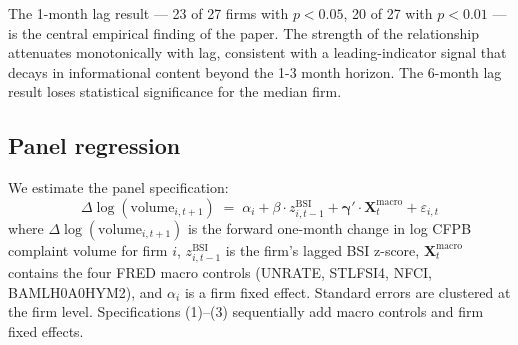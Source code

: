 \documentclass[11pt,a4paper]{article}
\begin{document}
\begin{table}[h]
\centering\small
{}
\caption{Granger causality F-tests of $\text{BSI}_{i,t-k} \to \text{volume}_{i,t}$ at lag $k$, aggregated across the 27-firm population. The 1-month-lag result is the strongest finding in the paper: 85\% of firms reject the no-Granger-causality null at $p<0.05$, with median p-value $0.0005$. Source: \texttt{empirics\_v2/out/granger\_aggregate.csv}.}\label{tab:granger}
\end{table}

\noindent The 1-month lag result --- 23 of 27 firms with $p<0.05$, 20 of 27 with $p<0.01$ --- is the central empirical finding of the paper. The strength of the relationship attenuates monotonically with lag, consistent with a leading-indicator signal that decays in informational content beyond the 1-3 month horizon. The 6-month lag result loses statistical significance for the median firm.

\subsection{Panel regression}\label{sec:results_panel}

We estimate the panel specification:
\begin{equation}\label{eq:panel}
\Delta \log(\text{volume}_{i,t+1}) \;=\; \alpha_i + \beta \cdot z^{\text{BSI}}_{i,t-1} + \boldsymbol{\gamma}' \cdot \mathbf{X}^{\text{macro}}_{t} + \varepsilon_{i,t}
\end{equation}
where $\Delta \log(\text{volume}_{i,t+1})$ is the forward one-month change in log CFPB complaint volume for firm $i$, $z^{\text{BSI}}_{i,t-1}$ is the firm's lagged BSI z-score, $\mathbf{X}^{\text{macro}}_{t}$ contains the four FRED macro controls (UNRATE, STLFSI4, NFCI, BAMLH0A0HYM2), and $\alpha_i$ is a firm fixed effect. Standard errors are clustered at the firm level. Specifications (1)--(3) sequentially add macro controls and firm fixed effects.
\end{document}
